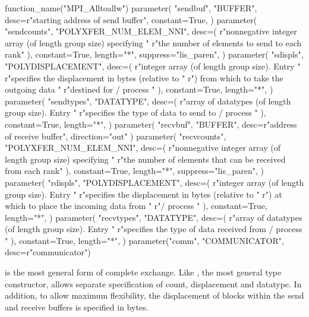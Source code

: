 \begin{mpi-binding}
    function_name("MPI_Alltoallw")
    parameter(
        "sendbuf",
        "BUFFER",
        desc=r"starting address of send buffer",
        constant=True,
    )
    parameter(
        "sendcounts",
        "POLYXFER_NUM_ELEM_NNI",
        desc=(
            r"nonnegative integer array (of length group size) specifying "
            r"the number of elements to send to each rank"
        ),
        constant=True,
        length="*",
        suppress="lis_paren",
    )
    parameter(
        "sdispls",
        "POLYDISPLACEMENT",
        desc=(
            r"integer array (of length group size). Entry  "
            r"specifies the displacement in bytes (relative to "
            r") from which to take the outgoing data "
            r"destined for \MPI/ process "
        ),
        constant=True,
        length="*",
    )
    parameter(
        "sendtypes",
        "DATATYPE",
        desc=(
            r"array of datatypes (of length group size). Entry  "
            r"specifies the type of data to send to \MPI/ process "
        ),
        constant=True,
        length="*",
    )
    parameter(
        "recvbuf", "BUFFER", desc=r"address of receive buffer", direction="out"
    )
    parameter(
        "recvcounts",
        "POLYXFER_NUM_ELEM_NNI",
        desc=(
            r"nonnegative integer array (of length group size) specifying "
            r"the number of elements that can be received from each rank"
        ),
        constant=True,
        length="*",
        suppress="lis_paren",
    )
    parameter(
        "rdispls",
        "POLYDISPLACEMENT",
        desc=(
            r"integer array (of length group size). Entry  "
            r"specifies the displacement in bytes (relative to "
            r") at which to place the incoming data from "
            r"\MPI/ process "
        ),
        constant=True,
        length="*",
    )
    parameter(
        "recvtypes",
        "DATATYPE",
        desc=(
            r"array of datatypes (of length group size). Entry  "
            r"specifies the type of data received from \MPI/ process "
        ),
        constant=True,
        length="*",
    )
    parameter("comm", "COMMUNICATOR", desc=r"communicator")
\end{mpi-binding}

is the most general form of complete exchange.
Like , the most general type constructor,
 allows separate specification of count,
displacement and datatype.  In addition, to allow maximum flexibility,
the displacement of blocks within the send and receive buffers is
specified in bytes.

